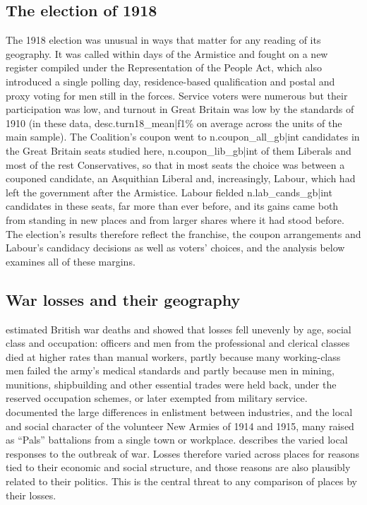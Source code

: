 \documentclass[11pt,a4paper]{article}
\begin{document}
\subsection{The election of 1918}
The 1918 election was unusual in ways that matter for any reading of its geography. It was called within days of the Armistice and fought on a new register compiled under the Representation of the People Act, which also introduced a single polling day, residence-based qualification and postal and proxy voting for men still in the forces. Service voters were numerous but their participation was low, and turnout in Great Britain was low by the standards of 1910 (in these data, {{desc.turn18_mean|f1}}\% on average across the units of the main sample). The Coalition's coupon went to {{n.coupon_all_gb|int}} candidates in the Great Britain seats studied here, {{n.coupon_lib_gb|int}} of them Liberals and most of the rest Conservatives, so that in most seats the choice was between a couponed candidate, an Asquithian Liberal and, increasingly, Labour, which had left the government after the Armistice. Labour fielded {{n.lab_cands_gb|int}} candidates in these seats, far more than ever before, and its gains came both from standing in new places and from larger shares where it had stood before. The election's results therefore reflect the franchise, the coupon arrangements and Labour's candidacy decisions as well as voters' choices, and the analysis below examines all of these margins.

\subsection{War losses and their geography}
\citet{winter1977,winter1985} estimated British war deaths and showed that losses fell unevenly by age, social class and occupation: officers and men from the professional and clerical classes died at higher rates than manual workers, partly because many working-class men failed the army's medical standards and partly because men in mining, munitions, shipbuilding and other essential trades were held back, under the reserved occupation schemes, or later exempted from military service. \citet{dewey1984} documented the large differences in enlistment between industries, and \citet{simkins1988} the local and social character of the volunteer New Armies of 1914 and 1915, many raised as ``Pals'' battalions from a single town or workplace. \citet{pennell2012} describes the varied local responses to the outbreak of war. Losses therefore varied across places for reasons tied to their economic and social structure, and those reasons are also plausibly related to their politics. This is the central threat to any comparison of places by their losses.
\end{document}
